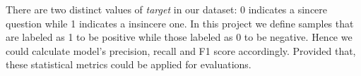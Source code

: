 \documentclass[12pt]{diazessay} %
\begin{document}
There are two distinct values of \textit{target} in our dataset: 0 indicates a sincere question while 1 indicates a insincere one. In this project we define samples that are labeled as 1 to be positive while those labeled as 0 to be negative. Hence we could calculate model's precision, recall and F1 score accordingly. Provided that, these statistical metrics could be applied for evaluations.













\newpage




\end{document}
